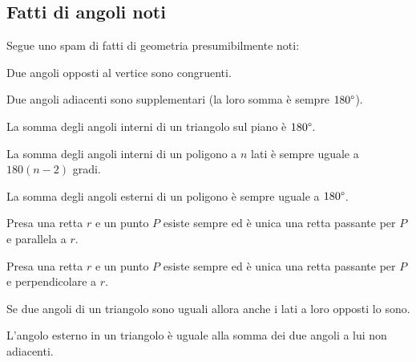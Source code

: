 \documentclass[11pt]{scrartcl}
\begin{document}
	\subsection{Fatti di angoli noti}
	Segue uno spam di fatti di geometria presumibilmente noti:
	\begin{fact}
		Due angoli opposti al vertice sono congruenti.
	\end{fact}
	\begin{fact}
		Due angoli adiacenti sono supplementari (la loro somma è sempre $180 \degree$).
	\end{fact}
	\begin{fact}
		La somma degli angoli interni di un triangolo sul piano è $180 \degree$.
	\end{fact}
	\begin{fact}
		La somma degli angoli interni di un poligono a $n$ lati è sempre uguale a $180(n-2)$ gradi.
	\end{fact}
	\begin{fact}
		La somma degli angoli esterni di un poligono è sempre uguale a $180 \degree$.
	\end{fact}
	\begin{fact}
		Presa una retta $r$ e un punto $P$ esiste sempre ed è unica una retta passante per $P$ e parallela a $r$.
	\end{fact}
	\begin{fact}
		Presa una retta $r$ e un punto $P$ esiste sempre ed è unica una retta passante per $P$ e perpendicolare a $r$.
	\end{fact}
	\begin{fact}
		Se due angoli di un triangolo sono uguali allora anche i lati a loro opposti lo sono.
	\end{fact}
	\begin{fact}
		L'angolo esterno in un triangolo è uguale alla somma dei due angoli a lui non adiacenti.
	\end{fact}
\end{document}
